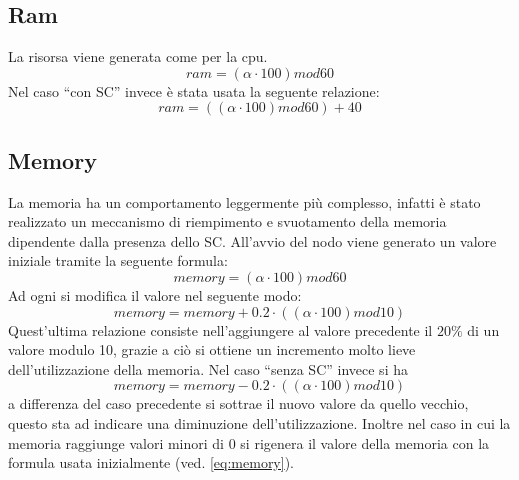 \subsection{Ram}
La risorsa viene generata come per la cpu.
\begin{equation}
ram = (\alpha \cdot 100) mod 60
\end{equation}
Nel caso ``con SC'' invece è stata usata la seguente relazione:
\begin{equation}
ram = ((\alpha \cdot 100) mod 60) + 40
\end{equation}
\subsection{Memory}
La memoria ha un comportamento leggermente più complesso, infatti è stato realizzato un meccanismo di riempimento e svuotamento della memoria dipendente dalla presenza dello SC. All'avvio del nodo viene generato un valore iniziale tramite la seguente formula:
\begin{equation}\label{eq:memory}
memory = (\alpha \cdot 100) mod 60
\end{equation}
Ad ogni  si modifica il valore nel seguente modo:
\begin{equation}
memory = memory + 0.2 \cdot ((\alpha \cdot 100) mod 10)
\end{equation}
Quest'ultima relazione consiste nell'aggiungere al valore precedente il $20\%$ di un valore modulo 10, grazie a ciò si ottiene un incremento molto lieve dell'utilizzazione della memoria.
Nel caso ``senza SC'' invece si ha
\begin{equation}
memory = memory - 0.2 \cdot ( ( \alpha \cdot 100 ) mod 10 )
\end{equation}
a differenza del caso precedente si sottrae il nuovo valore da quello vecchio, questo sta ad indicare una diminuzione dell'utilizzazione. Inoltre nel caso in cui la memoria raggiunge valori minori di 0 si rigenera il valore della memoria con la formula usata inizialmente (ved. \ref{eq:memory}).
